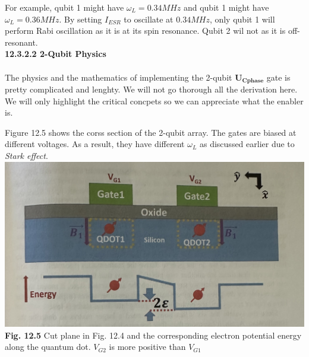 \documentclass{article}
\begin{document}
For example, qubit 1 might have $\omega_L=0.34MHz$ and qubit 1 might have $\omega_L=0.36MHz$.
By setting $I_{ESR}$ to oscillate at $0.34MHz$, only qubit 1 will perform Rabi oscillation as it
is at its spin resonance. Qubit 2 wil not as it is off-resonant.\\[15pt]
\textbf{12.3.2.2 2-Qubit Physics}\\\\
The physics and the mathematics of implementing the 2-qubit $\boldsymbol{U_{Cphase}}$ gate is pretty 
complicated and lenghty. We will not go thorough all the derivation here. We will only highlight the critical concpets so we 
can appreciate what the enabler is.

Figure 12.5 shows the corss section of the 2-qubit array. The gates are biased at different voltages.
As a result, they have different $\omega_L$ as discussed earlier due to \textit{Stark effect}.\\[5pt]

\includegraphics[scale=0.5]{Fig.12.5.jpeg}\\
\textbf{Fig. 12.5} Cut plane in Fig. 12.4 and the corresponding electron potential energy along the quantum dot.
$V_{G2}$ is more positive than $V_{G1}$\\[5pt]
\end{document}
